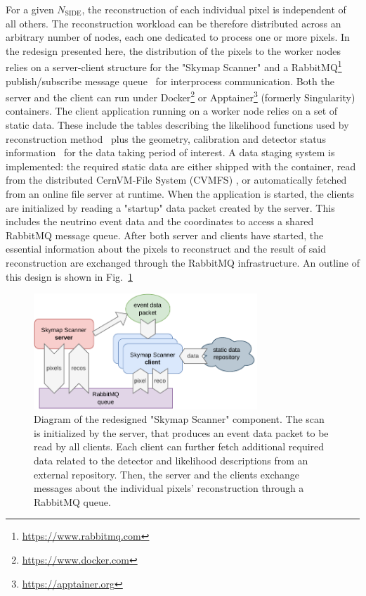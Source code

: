 \documentclass[a4paper,11pt]{article}
\begin{document}
For a given $N_\mathrm{SIDE}$, the reconstruction of each individual pixel is independent of all others. The reconstruction workload can be therefore distributed across an arbitrary number of nodes, each one dedicated to process one or more pixels. In the redesign presented here, the distribution of the pixels to the worker nodes relies on a server-client structure for the "Skymap Scanner" and a RabbitMQ\footnote{\url{https://www.rabbitmq.com}} publish/subscribe message queue~\cite{oasis2012advanced} for interprocess communication. Both the server and the client can run under Docker\footnote{\url{https://www.docker.com}} or Apptainer\footnote{\url{https://apptainer.org}} (formerly Singularity) containers. The client application running on a worker node relies on a set of static data. These include the tables describing the likelihood functions used by reconstruction method~\cite{IceCube:2023icrc-SPLINE} plus the geometry, calibration and detector status information~\cite{IceCube:2016zyt-INST} for the data taking period of interest. A data staging system is implemented: the required static data are either shipped with the container, read from the distributed CernVM-File System (CVMFS) \cite{Buncic_2010-CVMFS}, or automatically fetched from an online file server at runtime. When the application is started, the clients are initialized by reading a "startup" data packet created by the server. This includes the neutrino event data and the coordinates to access a shared RabbitMQ message queue. After both server and clients have started, the essential information about the pixels to reconstruct and the result of said reconstruction are exchanged through the RabbitMQ infrastructure. An outline of this design is shown in Fig.~\ref{scanner}

\begin{figure}
    \centering
    \includegraphics[width=0.75\textwidth]{figures/skymap-scanner.drawio.pdf}
    \caption{Diagram of the redesigned "Skymap Scanner" component. The scan is initialized by the server, that produces an event data packet to be read by all clients. Each client can further fetch additional required data related to the detector and likelihood descriptions from an external repository. Then, the server and the clients exchange messages about the individual pixels' reconstruction through a RabbitMQ queue.}
    \label{scanner}
\end{figure}
\end{document}
